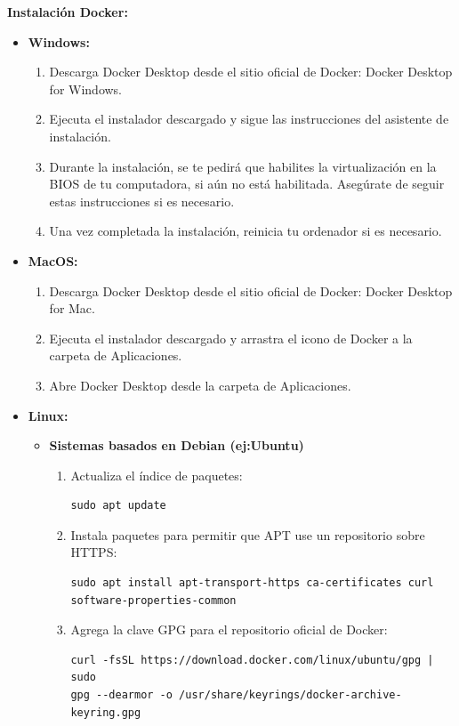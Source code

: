 \textbf{Instalación Docker:}
\begin{itemize}
    \item \textbf{Windows:} 
    \begin{enumerate}
        \item Descarga Docker Desktop desde el sitio oficial de Docker: Docker Desktop for Windows.
        \item Ejecuta el instalador descargado y sigue las instrucciones del asistente de instalación.
        \item Durante la instalación, se te pedirá que habilites la virtualización en la BIOS de tu computadora, si aún no está habilitada. Asegúrate de seguir estas instrucciones si es necesario.
        \item Una vez completada la instalación, reinicia tu ordenador si es necesario.
    \end{enumerate}
    \item \textbf{MacOS:}
    \begin{enumerate}
        \item Descarga Docker Desktop desde el sitio oficial de Docker: Docker Desktop for Mac.
        \item Ejecuta el instalador descargado y arrastra el icono de Docker a la carpeta de Aplicaciones.
        \item Abre Docker Desktop desde la carpeta de Aplicaciones.
    \end{enumerate}
    \item \textbf{Linux:} 
    \begin{itemize}
        \item \textbf{Sistemas basados en Debian (ej:Ubuntu)}
        \begin{enumerate}
            \item Actualiza el índice de paquetes: 
            \begin{lstlisting}[frame=single, basicstyle=\small]
sudo apt update
            \end{lstlisting}
            \item Instala paquetes para permitir que APT use un repositorio sobre HTTPS:
            \begin{lstlisting}[frame=single, basicstyle=\small]
sudo apt install apt-transport-https ca-certificates curl
software-properties-common
            \end{lstlisting}
            
            \item Agrega la clave GPG para el repositorio oficial de Docker:
            \begin{lstlisting}[frame=single, basicstyle=\small]
curl -fsSL https://download.docker.com/linux/ubuntu/gpg | sudo 
gpg --dearmor -o /usr/share/keyrings/docker-archive-keyring.gpg
            \end{lstlisting}
            

\end{enumerate}
\end{itemize}
\end{itemize}
